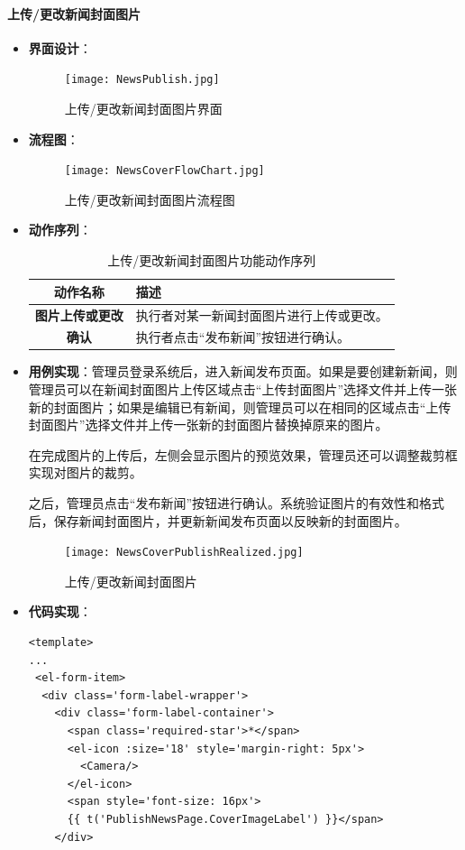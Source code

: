 \paragraph{上传/更改新闻封面图片}
\begin{itemize}
	\item \textbf{界面设计}：
	\begin{figure}[H]
		\centering
		\texttt{[image: NewsPublish.jpg]}
		\caption{上传/更改新闻封面图片界面}
		\label{NewsPublish}
	\end{figure}
	\item \textbf{流程图}：
	\begin{figure}[H]
		\centering
		\texttt{[image: NewsCoverFlowChart.jpg]}
		\caption{上传/更改新闻封面图片流程图}
		\label{NewsCoverFlowChart}
	\end{figure}
	\item \textbf{动作序列}：
	\begin{table}[H]
		\centering
		\caption{上传/更改新闻封面图片功能动作序列}
		\renewcommand\arraystretch{1.5}
		\begin{tabular}{|c|>{\raggedright\arraybackslash}p{10cm}|}
			\hline
			\textbf{动作名称} & \textbf{描述} \\ \hline
			\textbf{图片上传或更改} & 执行者对某一新闻封面图片进行上传或更改。 \\ \hline
			\textbf{确认} & 执行者点击“发布新闻”按钮进行确认。 \\ \hline
		\end{tabular}
	\end{table}
	\item \textbf{用例实现}：管理员登录系统后，进入新闻发布页面。如果是要创建新新闻，则管理员可以在新闻封面图片上传区域点击“上传封面图片”选择文件并上传一张新的封面图片；如果是编辑已有新闻，则管理员可以在相同的区域点击“上传封面图片”选择文件并上传一张新的封面图片替换掉原来的图片。
	
	在完成图片的上传后，左侧会显示图片的预览效果，管理员还可以调整裁剪框实现对图片的裁剪。
	
	之后，管理员点击“发布新闻”按钮进行确认。系统验证图片的有效性和格式后，保存新闻封面图片，并更新新闻发布页面以反映新的封面图片。
	\begin{figure}[H]
		\centering
		\texttt{[image: NewsCoverPublishRealized.jpg]}
		\caption{上传/更改新闻封面图片}
		\label{NewsCoverPublishRealized}
	\end{figure}
	\item \textbf{代码实现}：
	\begin{verbatim}
<template>
...
 <el-form-item>
  <div class='form-label-wrapper'>
    <div class='form-label-container'>
      <span class='required-star'>*</span>
      <el-icon :size='18' style='margin-right: 5px'>
        <Camera/>
      </el-icon>
      <span style='font-size: 16px'>
      {{ t('PublishNewsPage.CoverImageLabel') }}</span>
    </div>
	

\end{verbatim}
\end{itemize}
